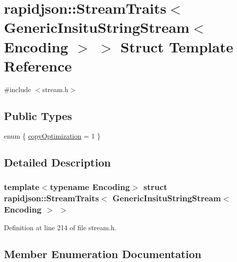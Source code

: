 \hypertarget{structrapidjson_1_1_stream_traits_3_01_generic_insitu_string_stream_3_01_encoding_01_4_01_4}{}\section{rapidjson\+::Stream\+Traits$<$ Generic\+Insitu\+String\+Stream$<$ Encoding $>$ $>$ Struct Template Reference}
\label{structrapidjson_1_1_stream_traits_3_01_generic_insitu_string_stream_3_01_encoding_01_4_01_4}


{\ttfamily \#include $<$stream.\+h$>$}

\subsection*{Public Types}
\begin{DoxyCompactItemize}
\item 
enum \{ \mbox{\hyperlink{structrapidjson_1_1_stream_traits_3_01_generic_insitu_string_stream_3_01_encoding_01_4_01_4_aa9b3b32a0ba57a7263455521508c9a84ab943169f50f1fc0616fedc1dd2605201}{copy\+Optimization}} = 1
 \}
\end{DoxyCompactItemize}


\subsection{Detailed Description}
\subsubsection*{template$<$typename Encoding$>$\newline
struct rapidjson\+::\+Stream\+Traits$<$ Generic\+Insitu\+String\+Stream$<$ Encoding $>$ $>$}



Definition at line 214 of file stream.\+h.



\subsection{Member Enumeration Documentation}
\mbox{\label{structrapidjson_1_1_stream_traits_3_01_generic_insitu_string_stream_3_01_encoding_01_4_01_4_aa9b3b32a0ba57a7263455521508c9a84}} 
